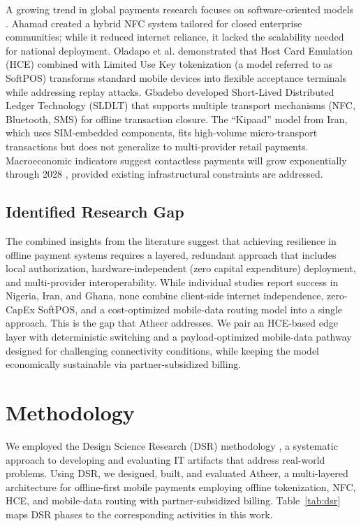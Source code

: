 \documentclass[conference,10pt]{IEEEtran}
\begin{document}
A growing trend in global payments research focuses on software-oriented models \cite{kemper2022}. Ahamad \cite{ahamad2022} created a hybrid NFC system tailored for closed enterprise communities; while it reduced internet reliance, it lacked the scalability needed for national deployment. Oladapo et al. \cite{oladapo2024} demonstrated that Host Card Emulation (HCE) combined with Limited Use Key tokenization (a model referred to as SoftPOS) transforms standard mobile devices into flexible acceptance terminals while addressing replay attacks. Gbadebo \cite{gbadebo2024} developed Short-Lived Distributed Ledger Technology (SLDLT) that supports multiple transport mechanisms (NFC, Bluetooth, SMS) for offline transaction closure. The ``Kipaad'' model from Iran, which uses SIM-embedded components, fits high-volume micro-transport transactions but does not generalize to multi-provider retail payments. Macroeconomic indicators suggest contactless payments will grow exponentially through 2028 \cite{juniper2024}, provided existing infrastructural constraints are addressed.

\subsection{Identified Research Gap}

The combined insights from the literature suggest that achieving resilience in offline payment systems requires a layered, redundant approach that includes local authorization, hardware-independent (zero capital expenditure) deployment, and multi-provider interoperability. While individual studies report success in Nigeria, Iran, and Ghana, none combine client-side internet independence, zero-CapEx SoftPOS, and a cost-optimized mobile-data routing model into a single approach. This is the gap that Atheer addresses. We pair an HCE-based edge layer with deterministic switching and a payload-optimized mobile-data pathway designed for challenging connectivity conditions, while keeping the model economically sustainable via partner-subsidized billing.

\section{Methodology}

We employed the Design Science Research (DSR) methodology \cite{hevner2004, peffers2007}, a systematic approach to developing and evaluating IT artifacts that address real-world problems. Using DSR, we designed, built, and evaluated Atheer, a multi-layered architecture for offline-first mobile payments employing offline tokenization, NFC, HCE, and mobile-data routing with partner-subsidized billing. Table~\ref{tab:dsr} maps DSR phases to the corresponding activities in this work.
\end{document}
